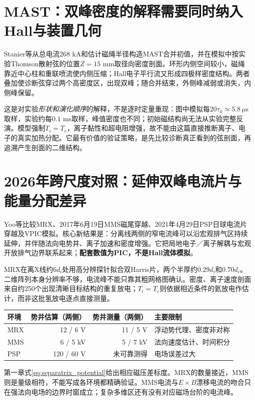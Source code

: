 \section{MAST：双峰密度的解释需要同时纳入Hall与装置几何}
Stanier等从总电流268 kA和估计磁绳半径构造MAST合并初值，并在模拟中按实验Thomson散射弦的位置$Z=15$ mm取径向密度剖面。环形内侧空间较小，磁绳靠近中心柱和重联喷流使内侧压缩；Hall电子平行流又形成四极样密度结构。两者叠加使诊断弦穿过两个高密度区，出现双峰；随合并结束，外侧峰减弱或消失，内侧峰保留。\citep{Stanier2013}

这是对实验\emph{形状和演化顺序}的解释，不是逐时定量重现：图中模拟每$20\tau_0\simeq5.8\,\mu$s取样，实验约每$0.1$ ms取样，峰值密度也不同；初始磁结构尚无法从实验完整反演。模型强制$T_i=T_e$，离子黏性和超电阻增强，故不能由这篇直接推断离子、电子的真实加热分配。它最有价值的验证策略，是先比较诊断真正看到的弦剖面，再追溯产生剖面的二维结构。

\section{2026年跨尺度对照：延伸双峰电流片与能量分配差异}
Yoo等比较MRX、2017年6月19日MMS磁尾穿越、2021年4月29日PSP日球电流片穿越及VPIC模拟。核心新结果是：分离线两侧的窄电流峰可以沿宏观排气区持续延伸，并伴随法向电势井、离子加速和密度增强。它把局地电子／离子解耦与宏观开放排气边界联系起来；\textbf{配套数值为PIC，不是Hall流体模拟}。\citep{L312}

MRX在离X线约$6d_i$处用高分辨探针拟合双Harris片，两个半厚约$0.29d_i$和$0.70d_i$。二维阵列本身分辨率不够，电流峰不能只靠其粗网格图确认。密度、离子速度剖面来自约250个出现清晰目标结构的重复放电；$T_i=T_e$则依据相近条件的氦放电作估计，而非这批氢放电逐点直接测量。

\begin{center}\small
\begin{tabular}{lrrl}\toprule
环境 & 势井估算（两侧） & 势井测量（两侧） & 主要限制\\\midrule
MRX &12 / 6 V&11 / 5 V&浮动势代理、密度非对称\\
MMS &6 / 5 kV&5 / 7 kV&法向速度估计、时间积分\\
PSP &120 / 60 V&未可靠测得&电场误差过大\\\bottomrule
\end{tabular}\end{center}
第一章式\eqref{eq:separatrix_potential}给出相应磁压差标度。MRX的数量接近，MMS则是量级相符，不能写成各环境都精确验证。MMS电流与$E\times B$漂移电流的吻合只在强法向电场的边界时窗成立；复杂多维区还有没有对应磁场台阶的电流峰。

